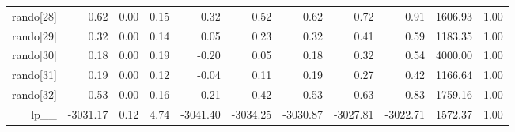 \begin{table}[ht]
\begin{tabular}{rrrrrrrrrrr}
  rando[28] & 0.62 & 0.00 & 0.15 & 0.32 & 0.52 & 0.62 & 0.72 & 0.91 & 1606.93 & 1.00 \\ 
  rando[29] & 0.32 & 0.00 & 0.14 & 0.05 & 0.23 & 0.32 & 0.41 & 0.59 & 1183.35 & 1.00 \\ 
  rando[30] & 0.18 & 0.00 & 0.19 & -0.20 & 0.05 & 0.18 & 0.32 & 0.54 & 4000.00 & 1.00 \\ 
  rando[31] & 0.19 & 0.00 & 0.12 & -0.04 & 0.11 & 0.19 & 0.27 & 0.42 & 1166.64 & 1.00 \\ 
  rando[32] & 0.53 & 0.00 & 0.16 & 0.21 & 0.42 & 0.53 & 0.63 & 0.83 & 1759.16 & 1.00 \\ 
  lp\_\_ & -3031.17 & 0.12 & 4.74 & -3041.40 & -3034.25 & -3030.87 & -3027.81 & -3022.71 & 1572.37 & 1.00 \\ 
   \hline
\end{tabular}
\label{weifit_tab}
\end{table}
